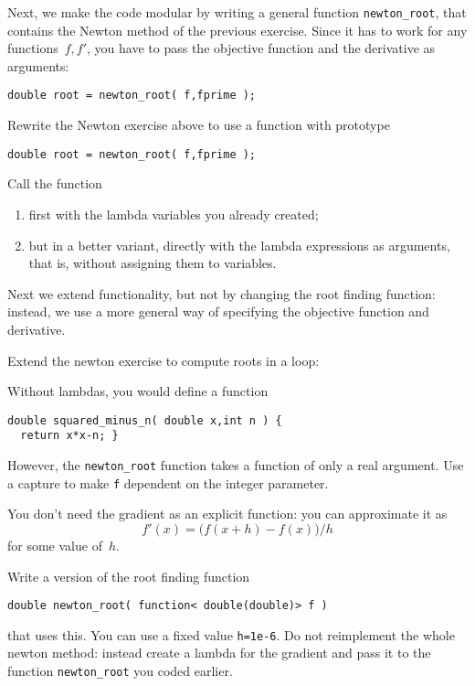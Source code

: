 Next, we make the code modular by 
writing a general function \lstinline+newton_root+,
that contains the Newton method of the previous exercise.
Since it has to work for any functions~$f,f'$,
you have to pass the objective function
and the derivative as arguments:
\begin{lstlisting}
double root = newton_root( f,fprime );
\end{lstlisting}

\begin{exercise}
  \label{ex:newton-function-ptr}
  Rewrite the Newton exercise above to use a function
  with prototype
\begin{lstlisting}
double root = newton_root( f,fprime );
\end{lstlisting}
Call the function
\begin{enumerate}
  \item first with the lambda variables you already created; 
  \item but in a better variant, 
    directly with the lambda expressions as arguments,
    that is,  without assigning them to variables.
\end{enumerate}
\end{exercise}

Next we extend functionality, but not by changing the root finding function:
instead, we use a more general way of specifying the objective function
and derivative.

\begin{exercise}
  \label{ex:newton-capture-root}
  Extend the newton exercise to compute roots in a loop:

  Without lambdas, you would define a function
\begin{lstlisting}
double squared_minus_n( double x,int n ) {
  return x*x-n; }
\end{lstlisting}
However, the \lstinline{newton_root} function takes a function of only
a real argument.
Use a capture to make \lstinline{f} dependent on the integer parameter.
\end{exercise}

\begin{exercise}
  \label{ex:newton-capture-diff}
  You don't need the gradient as an explicit function:
  you can approximate it as
  \[ f'(x) = \bigl( f(x+h)-f(x) \bigr) /h \]
  for some value of~$h$.

  Write a version of the root finding function
\begin{lstlisting}
double newton_root( function< double(double)> f ) 
\end{lstlisting}
that uses this. You can use a fixed value \lstinline+h=1e-6+.
Do not reimplement the whole newton method:
instead create a lambda for the gradient and pass it to the
function \lstinline+newton_root+ you coded earlier.
\end{exercise}

